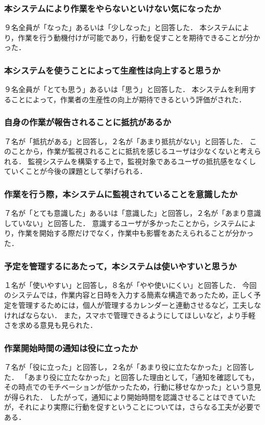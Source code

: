 \subsubsection{本システムにより作業をやらないといけない気になったか}
９名全員が「なった」あるいは「少しなった」と回答した．
本システムにより，作業を行う動機付けが可能であり，行動を促すことを期待できることが分かった．

\subsubsection{本システムを使うことによって生産性は向上すると思うか}
９名全員が「とても思う」あるいは「思う」と回答した．
本システムを利用することによって，作業者の生産性の向上が期待できるという評価がされた．

\subsubsection{自身の作業が報告されることに抵抗があるか}
７名が「抵抗がある」と回答し，２名が「あまり抵抗がない」と回答した．
このことから，作業が監視されることに抵抗を感じるユーザは少なくないと考えられる．
監視システムを構築する上で，監視対象であるユーザの抵抗感をなくしていくことが今後の課題として挙げられる．

\subsubsection{作業を行う際，本システムに監視されていることを意識したか}
７名が「とても意識した」あるいは「意識した」と回答し，２名が「あまり意識していない」と回答した．
意識するユーザが多かったことから，システムにより，作業を開始する際だけでなく，作業中も影響をあたえられることが分かった．

\subsubsection{予定を管理するにあたって，本システムは使いやすいと思うか}
１名が「使いやすい」と回答し，８名が「やや使いにくい」と回答した．
今回のシステムでは，作業内容と日時を入力する簡素な構造であったため，正しく予定を管理するためには，個人が管理するカレンダーと連動させるなど，工夫しなければならない．
また，スマホで管理できるようにしてほしいなど，より手軽さを求める意見も見られた．

\subsubsection{作業開始時間の通知は役に立ったか}
７名が「役に立った」と回答し，２名が「あまり役に立たなかった」と回答した．
「あまり役に立たなかった」と回答した理由として，「通知を確認しても，その時点でのモチベーションが低かったため，行動に移せなかった」という意見が得られた．
したがって，通知により開始時間を認識させることはできていたが，それにより実際に行動を促すということについては，さらなる工夫が必要である．

